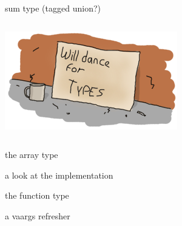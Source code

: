 \documentclass{beamer}
\begin{document}
\begin{frame}{sum type (tagged union?)}
  \begin{columns}
    \begin{column}[b]{5.5cm}
      \includegraphics[scale=0.4]{types-dance}
    \end{column}
    \begin{column}[b]{4.5cm}
      
    \end{column}
  \end{columns}
\end{frame}

\begin{frame}{the array type}
  
\end{frame}

\begin{frame}{a look at the implementation}
  
\end{frame}

\begin{frame}{the function type}
  
\end{frame}

\begin{frame}{a vaargs refresher}
  
\end{frame}
\end{document}
